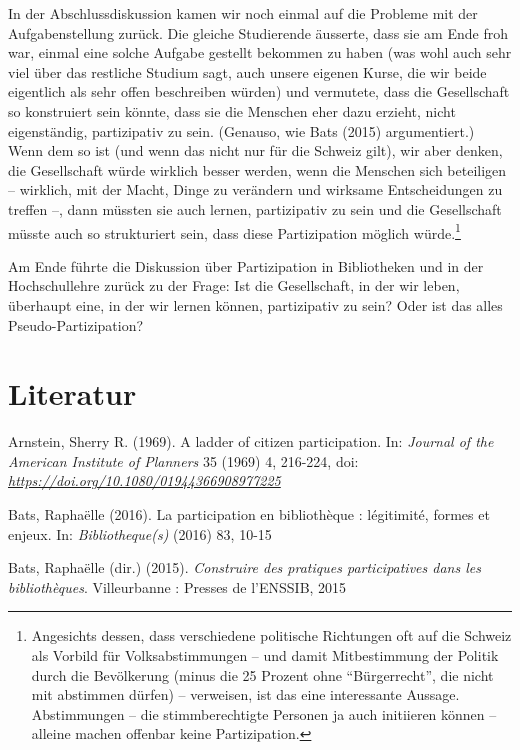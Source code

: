 \documentclass[a4paper,
fontsize=11pt,
oneside,
numbers=noperiodatend,
parskip=half-,
bibliography=totoc,
final
]{scrartcl}
\begin{document}
In der Abschlussdiskussion kamen wir noch einmal auf die Probleme mit
der Aufgabenstellung zurück. Die gleiche Studierende äusserte, dass sie
am Ende froh war, einmal eine solche Aufgabe gestellt bekommen zu haben
(was wohl auch sehr viel über das restliche Studium sagt, auch unsere
eigenen Kurse, die wir beide eigentlich als sehr offen beschreiben
würden) und vermutete, dass die Gesellschaft so konstruiert sein könnte,
dass sie die Menschen eher dazu erzieht, nicht eigenständig,
partizipativ zu sein. (Genauso, wie Bats (2015) argumentiert.) Wenn dem
so ist (und wenn das nicht nur für die Schweiz gilt), wir aber denken,
die Gesellschaft würde wirklich besser werden, wenn die Menschen sich
beteiligen -- wirklich, mit der Macht, Dinge zu verändern und wirksame
Entscheidungen zu treffen --, dann müssten sie auch lernen, partizipativ
zu sein und die Gesellschaft müsste auch so strukturiert sein, dass
diese Partizipation möglich würde.\footnote{Angesichts dessen, dass
  verschiedene politische Richtungen oft auf die Schweiz als Vorbild für
  Volksabstimmungen -- und damit Mitbestimmung der Politik durch die
  Bevölkerung (minus die 25 Prozent ohne \enquote{Bürgerrecht}, die
  nicht mit abstimmen dürfen) -- verweisen, ist das eine interessante
  Aussage. Abstimmungen -- die stimmberechtigte Personen ja auch
  initiieren können -- alleine machen offenbar keine Partizipation.}

Am Ende führte die Diskussion über Partizipation in Bibliotheken und in
der Hochschullehre zurück zu der Frage: Ist die Gesellschaft, in der wir
leben, überhaupt eine, in der wir lernen können, partizipativ zu sein?
Oder ist das alles Pseudo-Partizipation?

\section{Literatur}\label{literatur}

Arnstein, Sherry R. (1969). A ladder of citizen participation. In:
\emph{Journal of the American Institute of Planners} 35 (1969) 4,
216-224, doi:
\href{http://dx.doi.org/10.1080/01944366908977225}{\emph{https://doi.org/10.1080/01944366908977225}}

Bats, Raphaëlle (2016). La participation en bibliothèque : légitimité,
formes et enjeux. In: \emph{Bibliotheque(s)} (2016) 83, 10-15

Bats, Raphaëlle (dir.) (2015). \emph{Construire des pratiques
participatives dans les bibliothèques}. Villeurbanne : Presses de
l'ENSSIB, 2015
\end{document}

